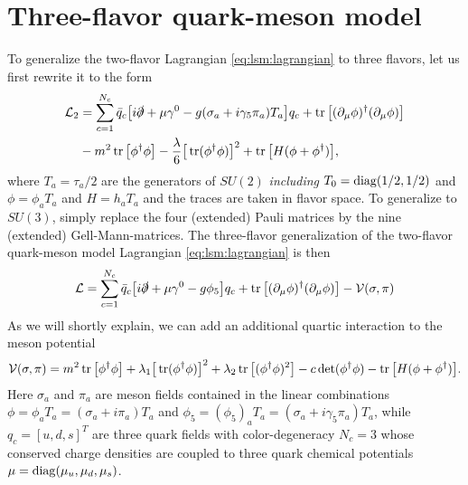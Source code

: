 \chapter{Three-flavor quark-meson model}
\label{chap:lsm3f}


To generalize the two-flavor Lagrangian \eqref{eq:lsm:lagrangian} to three flavors, let us first rewrite it to the form
\begin{equation}
\begin{split}
	\mathcal{L}_2 &= \sum_{c=1}^{N_c} \bar{q}_c \big[ i \slashed\partial + \mu \gamma^0 - g (\sigma_a + i \gamma_5 \pi_a ) T_a \big] q_c + \operatorname{tr}\big[(\partial_\mu \phi)^\dagger (\partial_\mu \phi)\big] \\
	        &- m^2 \operatorname{tr}\big[\phi^\dagger \phi\big] - \frac{\lambda}{6} \big[\operatorname{tr}(\phi^\dagger \phi)\big]^2 + \operatorname{tr}\big[H(\phi+\phi^\dagger)\big],
\end{split}
\end{equation}
where $T_a = \tau_a / 2$ are the generators of $SU(2)$ \emph{including} $T_0 = \operatorname{diag} (1/2, 1/2)$ and $\phi = \phi_a T_a$ and $H = h_a T_a$ and the traces are taken in flavor space.
To generalize to $SU(3)$, simply replace the four (extended) Pauli matrices by the nine (extended) Gell-Mann-matrices.
The three-flavor generalization of the two-flavor quark-meson model Lagrangian \eqref{eq:lsm:lagrangian} is then
\begin{equation}
	\mathcal{L} = \sum_{c=1}^{N_c} \bar{q}_c \big[ i \slashed\partial + \mu \gamma^0 - g \phi_5 \big] q_c + \operatorname{tr}\big[(\partial_\mu \phi)^\dagger (\partial_\mu \phi)\big] - \mathcal{V}(\sigma, \pi)
\label{eq:lsm:lagrangian3f}
\end{equation}
As we will shortly explain, we can add an additional quartic interaction to the meson potential
\begin{equation}
	\mathcal{V}(\sigma, \pi) = m^2 \operatorname{tr}\big[\phi^\dagger \phi\big] + \lambda_1 \big[\operatorname{tr}(\phi^\dagger \phi)\big]^2 + \lambda_2 \operatorname{tr}\big[(\phi^\dagger \phi)^2\big] - c \operatorname{det}(\phi^\dagger \phi) - \operatorname{tr}\big[H(\phi+\phi^\dagger)\big].
\label{eq:lsm:potential3f}
\end{equation}
Here $\sigma_a$ and $\pi_a$ are meson fields contained in the linear combinations $\phi = \phi_a T_a = (\sigma_a + i \pi_a) T_a$ and $\phi_5 = (\phi_5)_a T_a = (\sigma_a + i \gamma_5 \pi_a) T_a$,
while $q_c = [u, d, s]^T$ are three quark fields with color-degeneracy $N_c=3$ whose conserved charge densities are coupled to three quark chemical potentials $\mu = \operatorname{diag}(\mu_u, \mu_d, \mu_s)$.
